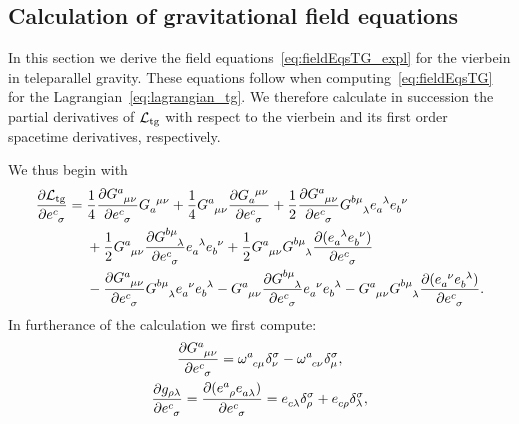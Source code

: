 \documentclass[
final,
11pt,
a4paper,
DIV=11,
headinclude=true,
footinclude=false,
bibliography=totoc,
twoside=true,  %
BCOR=5mm
]{scrbook}
\begin{document}
\newpage
\begin{subappendices}

\section{Calculation of gravitational field equations}
\label{sapp:fieldeqs_TG}

In this section we derive the field 
equations~\eqref{eq:fieldEqsTG_expl} for the vierbein in 
teleparallel gravity. These equations follow when 
computing~\eqref{eq:fieldEqsTG} for the 
Lagrangian~\eqref{eq:lagrangian_tg}. We therefore calculate in 
succession the partial derivatives of $\mathcal{L}_\mathrm{tg}$ with 
respect to the vierbein and its first order spacetime 
derivatives, respectively.

We thus begin with
\begin{align*}
  \frac{\pd \mathcal{L}_\mrm{tg}}{\pd e\ind{^c_\sigma}}
  &= \frac{1}{4} \frac{\pd G\ind{^a_{\mu\nu}}}{\pd 
    e\ind{^c_\sigma}} G\ind{_a^{\mu\nu}}
  + \frac{1}{4} G\ind{^a_{\mu\nu}} \frac{\pd 
    G\ind{_a^{\mu\nu}}}{\pd e\ind{^c_\sigma}}
  + \frac{1}{2} \frac{\pd G\ind{^a_{\mu\nu}}}{\pd 
    e\ind{^c_\sigma}} G\ind{^{b\mu}_\lambda} e\ind{_a^\lambda} 
  e\ind{_b^\nu}
  \\
  &\nla{} + \frac{1}{2} G\ind{^a_{\mu\nu}} \frac{\pd 
    G\ind{^{b\mu}_\lambda}}{\pd e\ind{^c_\sigma}} 
  e\ind{_a^\lambda} e\ind{_b^\nu}
  + \frac{1}{2} G\ind{^a_{\mu\nu}} G\ind{^{b\mu}_\lambda} 
  \frac{\pd( e\ind{_a^\lambda} e\ind{_b^\nu})}{\pd 
    e\ind{^c_\sigma}}
  \\
  &\nla{} - \frac{\pd G\ind{^a_{\mu\nu}}}{\pd e\ind{^c_\sigma}} 
  G\ind{^{b\mu}_\lambda} e\ind{_a^\nu} e\ind{_b^\lambda}
  - G\ind{^a_{\mu\nu}} \frac{\pd G\ind{^{b\mu}_\lambda}}{\pd 
    e\ind{^c_\sigma}} e\ind{_a^\nu} e\ind{_b^\lambda}
  - G\ind{^a_{\mu\nu}} G\ind{^{b\mu}_\lambda} \frac{\pd( 
    e\ind{_a^\nu} e\ind{_b^\lambda})}{\pd e\ind{^c_\sigma}}.
\end{align*}
In furtherance of the calculation we first compute:
\begin{gather*}
  \frac{\pd G\ind{^a_{\mu\nu}}}{\pd e\ind{^c_\sigma}}
  = \omega\ind{^a_{c\mu}} \delta^\sigma_\nu 
  - \omega\ind{^a_{c\nu}} \delta^\sigma_\mu,
  \\
  \frac{\pd g_{\rho\lambda}}{\pd e\ind{^c_\sigma}} 
  = \frac{\pd (e\ind{^a_\rho} 
    e\ind{_{a\lambda}})}{\pd e\ind{^c_\sigma}} 
  = e\ind{_{c\lambda}} \delta^\sigma_\rho + e\ind{_{c\rho}} 
  \delta^\sigma_\lambda,
  \\

\end{gather*}
\end{subappendices}
\end{document}
